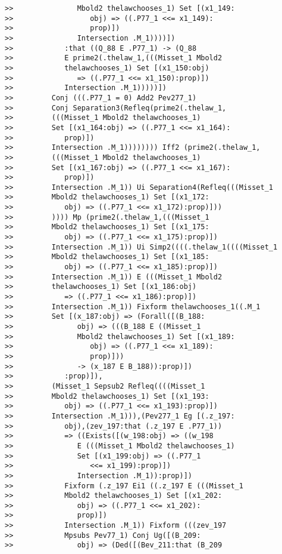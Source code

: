 \documentclass[12pt]{article}
\begin{document}
\begin{verbatim}
>>               Mbold2 thelawchooses_1) Set [(x1_149:
>>                  obj) => ((.P77_1 <<= x1_149):
>>                  prop)])
>>               Intersection .M_1))))])
>>            :that ((Q_88 E .P77_1) -> (Q_88
>>            E prime2(.thelaw_1,(((Misset_1 Mbold2
>>            thelawchooses_1) Set [(x1_150:obj)
>>               => ((.P77_1 <<= x1_150):prop)])
>>            Intersection .M_1)))))])
>>         Conj (((.P77_1 = 0) Add2 Pev277_1)
>>         Conj Separation3(Refleq(prime2(.thelaw_1,
>>         (((Misset_1 Mbold2 thelawchooses_1)
>>         Set [(x1_164:obj) => ((.P77_1 <<= x1_164):
>>            prop)])
>>         Intersection .M_1)))))))) Iff2 (prime2(.thelaw_1,
>>         (((Misset_1 Mbold2 thelawchooses_1)
>>         Set [(x1_167:obj) => ((.P77_1 <<= x1_167):
>>            prop)])
>>         Intersection .M_1)) Ui Separation4(Refleq(((Misset_1
>>         Mbold2 thelawchooses_1) Set [(x1_172:
>>            obj) => ((.P77_1 <<= x1_172):prop)]))
>>         )))) Mp (prime2(.thelaw_1,(((Misset_1
>>         Mbold2 thelawchooses_1) Set [(x1_175:
>>            obj) => ((.P77_1 <<= x1_175):prop)])
>>         Intersection .M_1)) Ui Simp2((((.thelaw_1((((Misset_1
>>         Mbold2 thelawchooses_1) Set [(x1_185:
>>            obj) => ((.P77_1 <<= x1_185):prop)])
>>         Intersection .M_1)) E (((Misset_1 Mbold2
>>         thelawchooses_1) Set [(x1_186:obj)
>>            => ((.P77_1 <<= x1_186):prop)])
>>         Intersection .M_1)) Fixform thelawchooses_1((.M_1
>>         Set [(x_187:obj) => (Forall([(B_188:
>>               obj) => (((B_188 E ((Misset_1
>>               Mbold2 thelawchooses_1) Set [(x1_189:
>>                  obj) => ((.P77_1 <<= x1_189):
>>                  prop)]))
>>               -> (x_187 E B_188)):prop)])
>>            :prop)]),
>>         (Misset_1 Sepsub2 Refleq((((Misset_1
>>         Mbold2 thelawchooses_1) Set [(x1_193:
>>            obj) => ((.P77_1 <<= x1_193):prop)])
>>         Intersection .M_1))),(Pev277_1 Eg [(.z_197:
>>            obj),(zev_197:that (.z_197 E .P77_1))
>>            => ((Exists([(w_198:obj) => ((w_198
>>               E (((Misset_1 Mbold2 thelawchooses_1)
>>               Set [(x1_199:obj) => ((.P77_1
>>                  <<= x1_199):prop)])
>>               Intersection .M_1)):prop)])
>>            Fixform (.z_197 Ei1 ((.z_197 E (((Misset_1
>>            Mbold2 thelawchooses_1) Set [(x1_202:
>>               obj) => ((.P77_1 <<= x1_202):
>>               prop)])
>>            Intersection .M_1)) Fixform (((zev_197
>>            Mpsubs Pev77_1) Conj Ug([(B_209:
>>               obj) => (Ded([(Bev_211:that (B_209

\end{verbatim}
\end{document}
